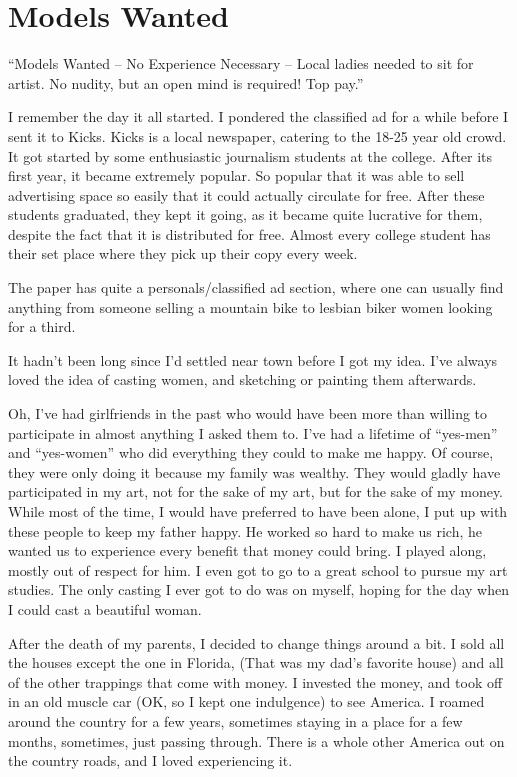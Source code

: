 \chapter{Models Wanted}

``Models Wanted -- No Experience Necessary -- Local ladies needed to sit for artist. No nudity,
but an open mind is required! Top pay.''

I remember the day it all started. I pondered the classified ad for a while before I sent it
to Kicks. Kicks is a local newspaper, catering to the 18-25 year old crowd. It got started by
some enthusiastic journalism students at the college. After its first year, it became extremely
popular. So popular that it was able to sell advertising space so easily that it could actually
circulate for free. After these students graduated, they kept it going, as it became quite
lucrative for them, despite the fact that it is distributed for free. Almost every college
student has their set place where they pick up their copy every week.

The paper has quite a personals/classified ad section, where one can usually find anything
from someone selling a mountain bike to lesbian biker women looking for a third.

It hadn't been long since I'd settled near town before I got my idea. I've always loved the
idea of casting women, and sketching or painting them afterwards.

Oh, I've had girlfriends in the past who would have been more than willing to participate in
almost anything I asked them to. I've had a lifetime of ``yes-men'' and ``yes-women'' who did
everything they could to make me happy. Of course, they were only doing it because my family was
wealthy. They would gladly have participated in my art, not for the sake of my art, but for the
sake of my money. While most of the time, I would have preferred to have been alone, I put up
with these people to keep my father happy. He worked so hard to make us rich, he wanted us to
experience every benefit that money could bring. I played along, mostly out of respect for him.
I even got to go to a great school to pursue my art studies. The only casting I ever got to do
was on myself, hoping for the day when I could cast a beautiful woman.

After the death of my parents, I decided to change things around a bit. I sold all the
houses except the one in Florida, (That was my dad's favorite house) and all of the other
trappings that come with money. I invested the money, and took off in an old muscle car (OK, so
I kept one indulgence) to see America. I roamed around the country for a few years, sometimes
staying in a place for a few months, sometimes, just passing through. There is a whole other
America out on the country roads, and I loved experiencing it.

